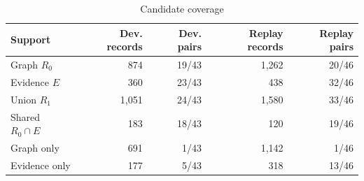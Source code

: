 \begin{table}[t]
\centering
\caption{Candidate coverage}
\label{tab:coverage}
\small
\setlength{\tabcolsep}{4pt}
\begin{tabular}{lrrrr}
\toprule
Support & Dev. records & Dev. pairs & Replay records & Replay pairs \\
\midrule
Graph $R_0$ & 874 & 19/43 & 1,262 & 20/46 \\
Evidence $E$ & 360 & 23/43 & 438 & 32/46 \\
Union $R_1$ & 1,051 & 24/43 & 1,580 & 33/46 \\
Shared $R_0\cap E$ & 183 & 18/43 & 120 & 19/46 \\
Graph only & 691 & 1/43 & 1,142 & 1/46 \\
Evidence only & 177 & 5/43 & 318 & 13/46 \\
\bottomrule
\end{tabular}
\end{table}
